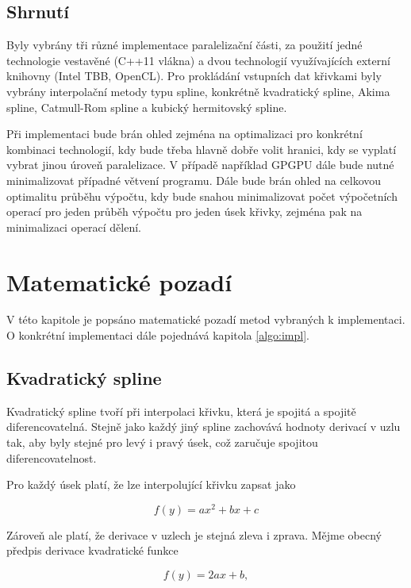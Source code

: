 \documentclass[]{thesiskiv}
\begin{document}
\section{Shrnutí}

Byly vybrány tři různé implementace paralelizační části, za použití jedné technologie vestavěné (C++11 vlákna) a dvou technologií využívajících externí knihovny (Intel TBB, OpenCL). Pro prokládání vstupních dat křivkami byly vybrány interpolační metody typu spline, konkrétně kvadratický spline, Akima spline, Catmull-Rom spline a kubický hermitovský spline.

Při implementaci bude brán ohled zejména na optimalizaci pro konkrétní kombinaci technologií, kdy bude třeba hlavně dobře volit hranici, kdy se vyplatí vybrat jinou úroveň paralelizace. V případě například GPGPU dále bude nutné minimalizovat případné větvení programu. Dále bude brán ohled na celkovou optimalitu průběhu výpočtu, kdy bude snahou minimalizovat počet výpočetních operací pro jeden průběh výpočtu pro jeden úsek křivky, zejména pak na minimalizaci operací dělení.


\chapter{Matematické pozadí}

V této kapitole je popsáno matematické pozadí metod vybraných k implementaci. O konkrétní implementaci dále pojednává kapitola \ref{algo:impl}.

\section{Kvadratický spline}

Kvadratický spline tvoří při interpolaci křivku, která je spojitá a spojitě diferencovatelná. Stejně jako každý jiný spline zachovává hodnoty derivací v uzlu tak, aby byly stejné pro levý i pravý úsek, což zaručuje spojitou diferencovatelnost.

Pro každý úsek platí, že lze interpolující křivku zapsat jako

\begin{equation}
f(y)=ax^2+bx+c
\end{equation}

Zároveň ale platí, že derivace v uzlech je stejná zleva i zprava. Mějme obecný předpis derivace kvadratické funkce

\begin{equation}
f(y)=2ax+b,
\end{equation}
\end{document}
